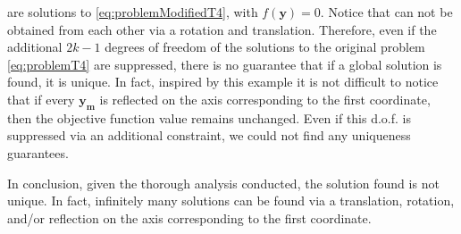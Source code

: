 \documentclass[12pt]{article}
\begin{document}
are solutions to \eqref{eq:problemModifiedT4}, with $f(\mathbf{y})=0$. Notice that can not be obtained from each other via a rotation and translation. Therefore, even if the additional $2k-1$ degrees of freedom of the solutions to the original problem \eqref{eq:problemT4} are suppressed, there is no guarantee that if a global solution is found, it is unique. In fact, inspired by this example it is not difficult to notice that if every $\mathbf{y_m}$ is reflected on the axis corresponding to the first coordinate, then the objective function value remains unchanged. Even if this d.o.f. is suppressed via an additional constraint, we could not find any uniqueness guarantees. 

In conclusion, given the thorough analysis conducted, the solution found is not unique. In fact, infinitely many solutions can be found via a translation, rotation, and/or reflection on the axis corresponding to the first coordinate.
\end{document}
